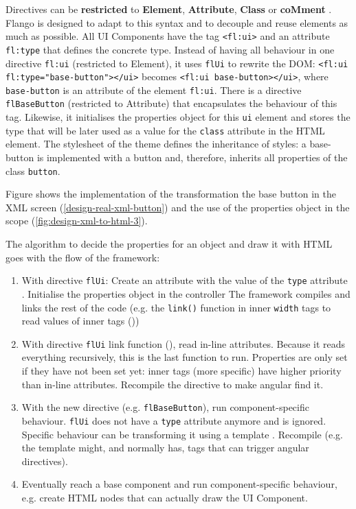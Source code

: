 Directives can be \textbf{restricted} to \textbf{Element}, \textbf{Attribute}, \textbf{Class} or \textbf{coMment} .
Flango \cm is designed to adapt to this syntax and to decouple and reuse elements as much as possible.
All UI Components have the tag \lstinline$<fl:ui>$ and an attribute \lstinline$fl:type$ that defines the concrete type.
Instead of having all behaviour in one directive \texttt{fl:ui} (restricted to Element), it uses \texttt{flUi} to rewrite the \ac{DOM}: \lstinline$<fl:ui fl:type="base-button"></ui>$ becomes \lstinline$<fl:ui base-button></ui>$, where \texttt{base-button} is an attribute of the element \texttt{fl:ui}.
There is a directive \texttt{flBaseButton} (restricted to Attribute) that encapsulates the behaviour of this tag.
Likewise, it initialises the properties object for this \texttt{ui} element and stores the type that will be later used as a value for the \texttt{class} attribute in the \ac{HTML} element.
The stylesheet of the theme defines the inheritance of styles: a base-button is implemented with a button and, therefore, inherits all properties of the class \texttt{button}.

Figure  shows the implementation of the transformation the base button in the \ac{XML} screen (\ref{design-real-xml-button}) and the use of the properties object in the scope (\ref{fig:design-xml-to-html-3}).

The algorithm to decide the properties for an object and draw it with \ac{HTML} goes with the flow of the framework:
\begin{enumerate}
	\item With directive \texttt{flUi}: Create an attribute with the value of the \texttt{type} attribute . Initialise the properties object in the controller  The framework compiles and links the rest of the code (e.g. the \texttt{link()} function in inner \texttt{width} tags to read values of inner tags ())
	\item With directive \texttt{flUi} link function (), read in-line attributes. Because it reads everything recursively, this is the last function to run. Properties are only set if they have not been set yet: inner tags (more specific) have higher priority than in-line attributes. Recompile the directive to make angular find it. 
	\item With the new directive (e.g. \texttt{flBaseButton}), run component-specific behaviour. \texttt{flUi} does not have a \texttt{type} attribute anymore and is ignored. Specific behaviour can be transforming it using a template . Recompile (e.g. the template might, and normally has, tags that can trigger angular directives).
	\item Eventually reach a base component and run component-specific behaviour, e.g. create \ac{HTML} nodes that can actually draw the UI Component.
\end{enumerate}

